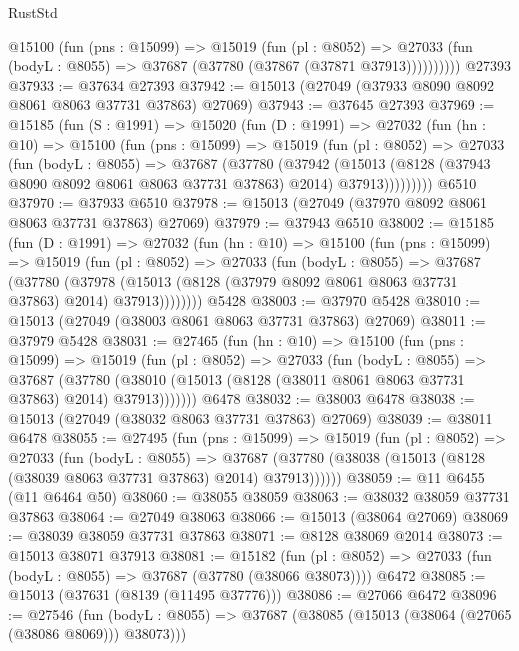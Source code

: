\begin{lexlean}{RustStd}
\begin{coremodule}
          @15100
            (fun (pns : @15099) =>
            @15019
              (fun (pl : @8052) =>
              @27033 (fun (bodyL : @8055) => @37687 (@37780 (@37867 (@37871 @37913))))))))))
    @27393
@37933 := @37634 @27393
@37942 := @15013 (@27049 (@37933 @8090 @8092 @8061 @8063 @37731 @37863) @27069)
@37943 := @37645 @27393
@37969 := @15185
    (fun (S : @1991) =>
    @15020
      (fun (D : @1991) =>
      @27032
        (fun (hn : @10) =>
        @15100
          (fun (pns : @15099) =>
          @15019
            (fun (pl : @8052) =>
            @27033
              (fun (bodyL : @8055) =>
              @37687
                (@37780
                  (@37942
                    (@15013
                      (@8128 (@37943 @8090 @8092 @8061 @8063 @37731 @37863) @2014)
                      @37913)))))))))
    @6510
@37970 := @37933 @6510
@37978 := @15013 (@27049 (@37970 @8092 @8061 @8063 @37731 @37863) @27069)
@37979 := @37943 @6510
@38002 := @15185
    (fun (D : @1991) =>
    @27032
      (fun (hn : @10) =>
      @15100
        (fun (pns : @15099) =>
        @15019
          (fun (pl : @8052) =>
          @27033
            (fun (bodyL : @8055) =>
            @37687
              (@37780
                (@37978
                  (@15013 (@8128 (@37979 @8092 @8061 @8063 @37731 @37863) @2014) @37913))))))))
    @5428
@38003 := @37970 @5428
@38010 := @15013 (@27049 (@38003 @8061 @8063 @37731 @37863) @27069)
@38011 := @37979 @5428
@38031 := @27465
    (fun (hn : @10) =>
    @15100
      (fun (pns : @15099) =>
      @15019
        (fun (pl : @8052) =>
        @27033
          (fun (bodyL : @8055) =>
          @37687
            (@37780 (@38010 (@15013 (@8128 (@38011 @8061 @8063 @37731 @37863) @2014) @37913)))))))
    @6478
@38032 := @38003 @6478
@38038 := @15013 (@27049 (@38032 @8063 @37731 @37863) @27069)
@38039 := @38011 @6478
@38055 := @27495
    (fun (pns : @15099) =>
    @15019
      (fun (pl : @8052) =>
      @27033
        (fun (bodyL : @8055) =>
        @37687 (@37780 (@38038 (@15013 (@8128 (@38039 @8063 @37731 @37863) @2014) @37913))))))
@38059 := @11 @6455 (@11 @6464 @50)
@38060 := @38055 @38059
@38063 := @38032 @38059 @37731 @37863
@38064 := @27049 @38063
@38066 := @15013 (@38064 @27069)
@38069 := @38039 @38059 @37731 @37863
@38071 := @8128 @38069 @2014
@38073 := @15013 @38071 @37913
@38081 := @15182
    (fun (pl : @8052) => @27033 (fun (bodyL : @8055) => @37687 (@37780 (@38066 @38073))))
    @6472
@38085 := @15013 (@37631 (@8139 (@11495 @37776)))
@38086 := @27066 @6472
@38096 := @27546
    (fun (bodyL : @8055) => @37687 (@38085 (@15013 (@38064 (@27065 (@38086 @8069))) @38073)))

\end{coremodule}
\end{lexlean}
